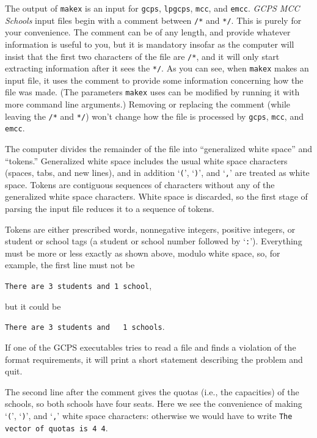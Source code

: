 \documentclass[12pt]{article}
\theoremstyle{definition}
\begin{document}
\medskip

The output of \texttt{makex} is an input for \texttt{gcps},
\texttt{lpgcps}, \texttt{mcc}, and \texttt{emcc}.  \emph{GCPS MCC
Schools} input files begin with a comment between \texttt{/*} and
\texttt{*/}.  This is purely for your convenience.  The comment can be
of any length, and provide whatever information is useful to you, but
it is mandatory insofar as the computer will insist that the first two
characters of the file are \texttt{/*}, and it will only start
extracting information after it sees the \texttt{*/}.  As you can see,
when \texttt{makex} makes an input file, it uses the comment to
provide some information concerning how the file was made.  (The
parameters \texttt{makex} uses can be modified by running it with more
command line arguments.)  Removing or replacing the comment (while
leaving the \texttt{/*} and \texttt{*/}) won't change how the file is
processed by \texttt{gcps}, \texttt{mcc}, and \texttt{emcc}.

The computer divides the remainder of the file into ``generalized
white space'' and ``tokens.''  Generalized white space includes the
usual white space characters (spaces, tabs, and new lines), and in
addition `\texttt{(}', `\texttt{)}', and `\texttt{,}' are treated as
white space.  Tokens are contiguous sequences of characters without
any of the generalized white space characters.  White space is
discarded, so the first stage of parsing the input file reduces it to
a sequence of tokens.

Tokens are either prescribed words, nonnegative integers, positive
integers, or student or school tags (a student or school number
followed by `\texttt{:}').  Everything must be more or less exactly as
shown above, modulo white space, so, for example, the first line must
not be

\texttt{There are 3 students and 1 school},

\noindent
but it could be

\texttt{There are 3 students and \ \ 1 schools}.

\noindent
If one of the GCPS executables tries to read a file and finds a
violation of the format requirements, it will print a short statement
describing the problem and quit.

The second line after the comment gives the quotas (i.e., the
capacities) of the schools, so both schools have four seats.
Here we see the convenience of making `\texttt{(}', `\texttt{)}', and
`\texttt{,}' white space characters: otherwise we would have to write
\texttt{The vector of quotas is 4 4}.
\end{document}
